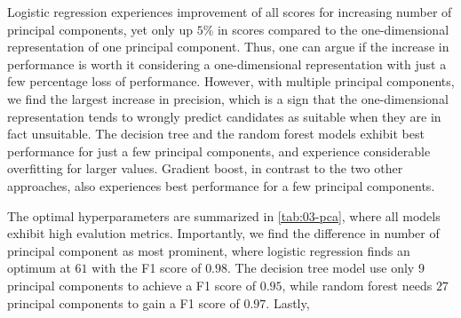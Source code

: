 Logistic regression experiences improvement of all scores for increasing number of principal components, yet only up $5\%$ in scores compared to the one-dimensional representation of one principal component. Thus, one can argue if the increase in performance is worth it considering a one-dimensional representation with just a few percentage loss of performance. However, with multiple principal components, we find the largest increase in precision, which is a sign that the one-dimensional representation tends to wrongly predict candidates as suitable when they are in fact unsuitable. The decision tree and the random forest models exhibit best performance for just a few principal components, and experience considerable overfitting for larger values. Gradient boost, in contrast to the two other approaches, also experiences best performance for a few principal components.

\begin{table}[!ht]
\centering
\caption{A table of the optimal number of principal components and the respective scores (standard deviation) for the insightful approach, as visualized in the dash-dotted line in \autoref{fig:03-pca}.}
\label{tab:03-pca}
\noindent{}
\end{table}

The optimal hyperparameters are summarized in \autoref{tab:03-pca}, where all models exhibit high evalution metrics. Importantly, we find the difference in number of principal component as most prominent, where logistic regression finds an optimum at $61$ with the F1 score of $0.98$. The decision tree model use only $9$ principal components to achieve a F1 score of $0.95$, while random forest needs $27$ principal components to gain a F1 score of $0.97$. Lastly,

